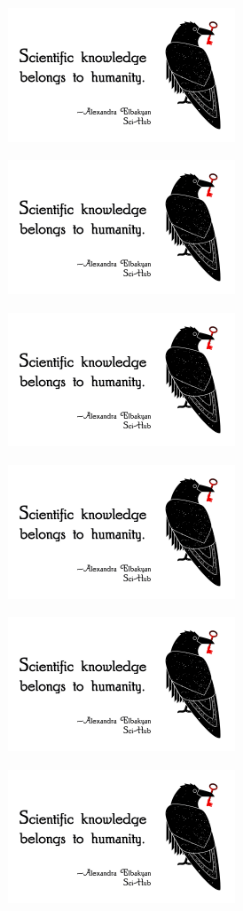 \documentclass[a4paper,14pt]{extarticle}
\begin{document}
\vspace{2mm}


\parbox[c][34mm]{70mm}{\includegraphics[width=60mm]{humanity-sticker} }
\parbox[c][34mm]{70mm}{\includegraphics[width=60mm]{humanity-sticker} }
\parbox[c][34mm]{70mm}{\includegraphics[width=60mm]{humanity-sticker} }

\vspace{4mm}


\parbox[c][34mm]{70mm}{\includegraphics[width=60mm]{humanity-sticker} }
\parbox[c][34mm]{70mm}{\includegraphics[width=60mm]{humanity-sticker} }
\parbox[c][34mm]{70mm}{\includegraphics[width=60mm]{humanity-sticker} }
\end{document}
